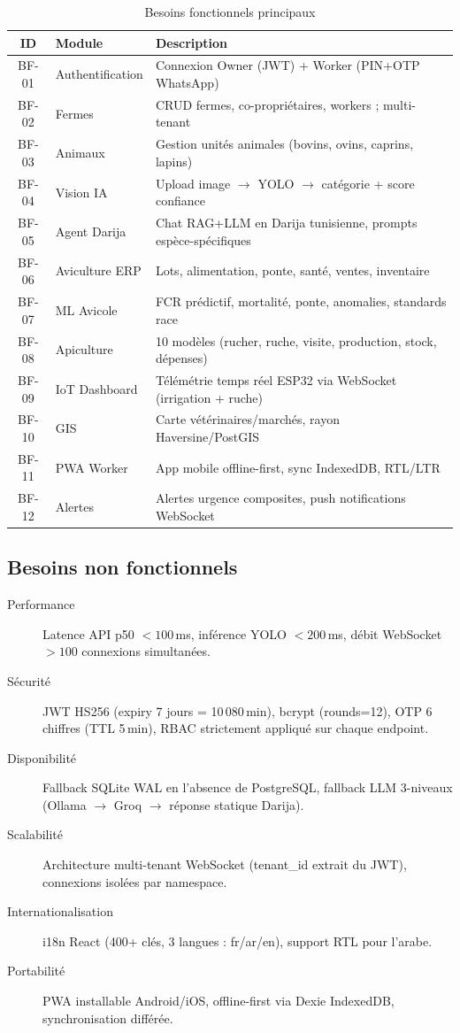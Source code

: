 \documentclass[12pt,a4paper,twoside]{report}
\newcounter{hi}
\begin{document}
\begin{table}[H]
\centering
\caption{Besoins fonctionnels principaux}
\label{tab:bf}
\begin{tabularx}{\linewidth}{clX}
\toprule
\textbf{ID} & \textbf{Module} & \textbf{Description} \\
\midrule
BF-01 & Authentification & Connexion Owner (JWT) + Worker (PIN+OTP WhatsApp) \\
BF-02 & Fermes & CRUD fermes, co-propriétaires, workers ; multi-tenant \\
BF-03 & Animaux & Gestion unités animales (bovins, ovins, caprins, lapins) \\
BF-04 & Vision IA & Upload image $\rightarrow$ YOLO $\rightarrow$ catégorie + score confiance \\
BF-05 & Agent Darija & Chat RAG+LLM en Darija tunisienne, prompts espèce-spécifiques \\
BF-06 & Aviculture ERP & Lots, alimentation, ponte, santé, ventes, inventaire \\
BF-07 & ML Avicole & FCR prédictif, mortalité, ponte, anomalies, standards race \\
BF-08 & Apiculture & 10 modèles (rucher, ruche, visite, production, stock, dépenses) \\
BF-09 & IoT Dashboard & Télémétrie temps réel ESP32 via WebSocket (irrigation + ruche) \\
BF-10 & GIS & Carte vétérinaires/marchés, rayon Haversine/PostGIS \\
BF-11 & PWA Worker & App mobile offline-first, sync IndexedDB, RTL/LTR \\
BF-12 & Alertes & Alertes urgence composites, push notifications WebSocket \\
\bottomrule
\end{tabularx}
\end{table}

\subsection{Besoins non fonctionnels}

\begin{description}
  \item[Performance] Latence API p50 $< 100$\,ms, inférence YOLO $< 200$\,ms,
        débit WebSocket $> 100$ connexions simultanées.
  \item[Sécurité] JWT HS256 (expiry 7 jours = 10\,080\,min), bcrypt (rounds=12), OTP 6 chiffres
        (TTL 5\,min), RBAC strictement appliqué sur chaque endpoint.
  \item[Disponibilité] Fallback SQLite WAL en l'absence de PostgreSQL,
        fallback LLM 3-niveaux (Ollama $\rightarrow$ Groq $\rightarrow$ réponse statique Darija).
  \item[Scalabilité] Architecture multi-tenant WebSocket (tenant\_id extrait
        du JWT), connexions isolées par namespace.
  \item[Internationalisation] i18n React (400+ clés, 3 langues : fr/ar/en),
        support RTL pour l'arabe.
  \item[Portabilité] PWA installable Android/iOS, offline-first via Dexie
        IndexedDB, synchronisation différée.
\end{description}
\end{document}
